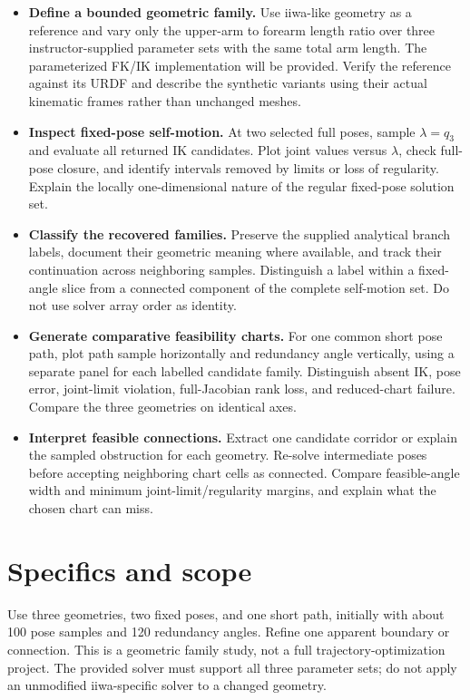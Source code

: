 \documentclass[11pt,a4paper]{article}
\begin{document}
\begin{itemize}
  \item \textbf{Define a bounded geometric family.} Use iiwa-like geometry as a
reference and vary only the upper-arm to forearm length ratio over three
instructor-supplied parameter sets with the same total arm length. The
parameterized FK/IK implementation will be provided. Verify the reference
against its URDF and describe the synthetic variants using their actual
kinematic frames rather than unchanged meshes.

  \item \textbf{Inspect fixed-pose self-motion.} At two selected full poses, sample
$\lambda=q_3$ and evaluate all returned IK candidates. Plot joint values versus
$\lambda$, check full-pose closure, and identify intervals removed by limits
or loss of regularity. Explain the locally one-dimensional nature of the
regular fixed-pose solution set.

  \item \textbf{Classify the recovered families.} Preserve the supplied analytical
branch labels, document their geometric meaning where available, and track
their continuation across neighboring samples. Distinguish a label within a
fixed-angle slice from a connected component of the complete self-motion set.
Do not use solver array order as identity.

  \item \textbf{Generate comparative feasibility charts.} For one common short pose
path, plot path sample horizontally and redundancy angle vertically, using a
separate panel for each labelled candidate family. Distinguish absent IK,
pose error, joint-limit violation, full-Jacobian rank loss, and reduced-chart
failure. Compare the three geometries on identical axes.

  \item \textbf{Interpret feasible connections.} Extract one candidate corridor or
explain the sampled obstruction for each geometry. Re-solve intermediate poses
before accepting neighboring chart cells as connected. Compare feasible-angle
width and minimum joint-limit/regularity margins, and explain what the chosen
chart can miss.
\end{itemize}

\newpage
\section*{Specifics and scope}
Use three geometries, two fixed poses, and one short path, initially with
about 100 pose samples and 120 redundancy angles. Refine one apparent boundary
or connection. This is a geometric family study, not a full trajectory-optimization
project. The provided solver must support all three parameter sets; do not
apply an unmodified iiwa-specific solver to a changed geometry.
\end{document}
